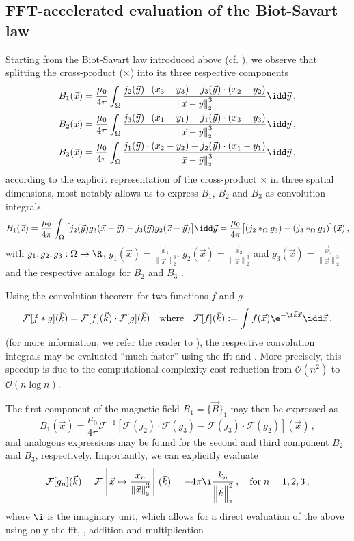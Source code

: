 \documentclass[10pt]{article}
\renewcommand{\norm}[1]{\left\lVert#1\right\rVert_{\scriptscriptstyle 2}}
\begin{document}
  \subsection{FFT-accelerated evaluation of the Biot-Savart law}
  \label{sec:fft-biot}
  Starting from the Biot-Savart law introduced above (cf. ), we observe that splitting the cross-product ($\times$) into its three respective components
  \begin{align*}
    B_1(\vec{x}) & = \frac{\mu_0}{4\pi} \int_{\Omega} \frac{j_2(\vec{y}) \cdot (x_3 - y_3) - j_3(\vec{y}) \cdot (x_2 - y_2)}{\norm{\vec{x} - \vec{y}}^3} \idd\vec{y} \,, \\
    B_2(\vec{x}) & = \frac{\mu_0}{4\pi} \int_{\Omega} \frac{j_3(\vec{y}) \cdot (x_1 - y_1) - j_1(\vec{y}) \cdot (x_3 - y_3)}{\norm{\vec{x} - \vec{y}}^3} \idd\vec{y} \,, \\
    B_3(\vec{x}) & = \frac{\mu_0}{4\pi} \int_{\Omega} \frac{j_1(\vec{y}) \cdot (x_2 - y_2) - j_2(\vec{y}) \cdot (x_1 - y_1)}{\norm{\vec{x} - \vec{y}}^3} \idd\vec{y} \,,
  \end{align*}
  according to the explicit representation of the cross-product $\times$ in three spatial dimensions, most notably allows us to express $B_1$, $B_2$ and $B_3$ as convolution integrals
  $$B_1(\vec{x}) = \frac{\mu_0}{4\pi} \int_{\Omega} \big[j_2(\vec{y}) g_3(\vec{x} - \vec{y}) - j_3(\vec{y}) g_2(\vec{x} - \vec{y})\big]\idd\vec{y} = \frac{\mu_0}{4\pi} \big[(j_2 *_{\Omega} g_3) - (j_3 *_{\Omega} g_2)\big](\vec{x})\,,$$
  with $g_1, g_2, g_3: \Omega \to \R$, $g_1(\vec{x}) = \frac{\vec{x}_1}{\norm{\vec{x}}^3}$, $g_2(\vec{x}) = \frac{\vec{x}_2}{\norm{\vec{x}}^3}$ and $g_3(\vec{x}) = \frac{\vec{x}_3}{\norm{\vec{x}}^3}$ and the respective analogs for $B_2$ and $B_3$ \parencite{2020-biot-savart-evaluation-fft}.

  Using the convolution theorem for two functions $f$ and $g$
  $$\mathcal{F}[f * g](\vec{k}) = \mathcal{F}[f](\vec{k}) \cdot \mathcal{F}[g](\vec{k}) \quad\text{where}\quad \mathcal{F}[f](\vec{k}) := \int f(\vec{x}) \e^{-\i \vec{k} \vec{x}}\idd\vec{x}\,,$$
  (for more information, we refer the reader to \cite{2022-convolution-theorem}), the respective convolution integrals may be evaluated ``much faster'' using the \gls{fft} and .
  More precisely, this speedup is due to the computational complexity cost reduction from $\mathcal{O}(n^2)$ to $\mathcal{O}(n \log n)$. %

  The first component of the magnetic field $B_1 = \{\vec{B}\}_1$ may then be expressed as
  $$B_1(\vec{x}) = \frac{\mu_0}{4\pi}\mathcal{F}^{-1}\left[\mathcal{F}(j_2) \cdot \mathcal{F}(g_3) - \mathcal{F}(j_3) \cdot \mathcal{F}(g_2)\right](\vec{x})\,,$$
  and analogous expressions may be found for the second and third component $B_2$ and $B_3$, respectively.
  Importantly, we can explicitly evaluate
  $$\mathcal{F}[g_n](\vec{k}) = \mathcal{F}\left[\vec{x} \mapsto \frac{x_n}{\norm{\vec{x}}^3}\right](\vec{k}) = -4\pi\i \frac{k_n}{\norm{\vec{k}}^2}\,, \quad\text{for}\; n=1,2,3\,,$$
  where $\i$ is the imaginary unit,
  which allows for a direct evaluation of the above using only the \gls{fft}, , addition and multiplication \parencite{2020-biot-savart-evaluation-fft}.
\end{document}
